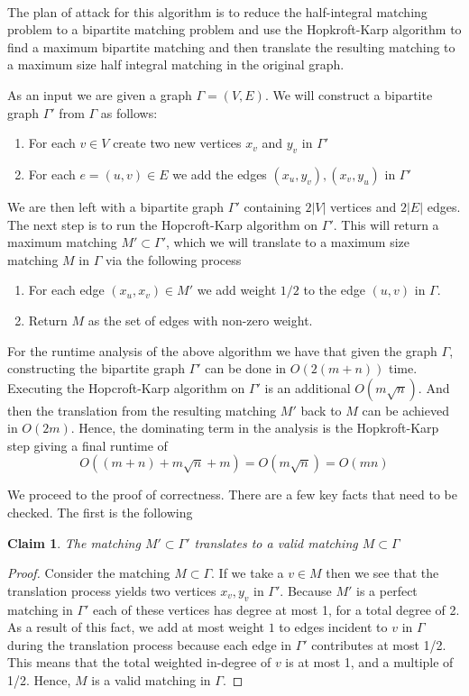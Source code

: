 \documentclass{article}
\newcommand{\problem}[1]{\noindent {\bf #1}}
\newtheorem*{claim}{Claim}
\begin{document}
\problem{Problem 3} \\
The plan of attack for this algorithm is to reduce the half-integral matching problem to a bipartite matching problem and use the Hopkroft-Karp algorithm to find a maximum bipartite matching and then translate the resulting matching to a maximum size half integral matching in the original graph.

As an input we are given a graph $\Gamma = (V,E)$. We will construct a bipartite graph $\Gamma'$ from $\Gamma$ as follows:
\begin{enumerate}
\item For each $v \in V$ create two new vertices $x_v$ and $y_v$ in $\Gamma'$
\item For each $e = (u,v) \in E$ we add the edges $(x_u,y_v), (x_v, y_u)$ in $\Gamma'$ 
\end{enumerate}

We are then left with a bipartite graph $\Gamma'$ containing $2|V|$ vertices and $2|E|$ edges. The next step is to run the Hopcroft-Karp algorithm on $\Gamma'$. This will return a maximum matching $M' \subset \Gamma'$, which we will translate to a maximum size matching $M$ in $\Gamma$ via the following process
\begin{enumerate}
\item For each edge $(x_u,x_v) \in M'$ we add weight $1/2$ to the edge $(u,v)$ in $\Gamma$. 
\item Return $M$ as the set of edges with non-zero weight. 
\end{enumerate}

For the runtime analysis of the above algorithm we have that given the graph $\Gamma$, constructing the bipartite graph $\Gamma'$ can be done in $O(2(m+n))$ time. Executing the Hopcroft-Karp algorithm on $\Gamma'$ is an additional $O(m\sqrt{n})$. And then the translation from the resulting matching $M'$ back to $M$ can be achieved in $O(2m)$. Hence, the dominating term in the analysis is the Hopkroft-Karp step giving a final runtime of 
\[
O((m+n) + m\sqrt{n} + m) = O(m\sqrt{n}) = O(mn)
\]

We proceed to the proof of correctness. There are a few key facts that need to be checked. The first is the following\\

\begin{claim}
The matching $M' \subset \Gamma'$ translates to a valid matching $M \subset \Gamma$ 
\end{claim}
\begin{proof}
Consider the matching $M \subset \Gamma$. If we take a $v \in M$ then we see that the translation process yields two vertices $x_v, y_v$ in $\Gamma'$. Because $M'$ is a perfect matching in $\Gamma'$ each of these vertices has degree at most 1, for a total degree of 2. As a result of this fact, we add at most weight $1$ to edges incident to $v$ in $\Gamma$ during the translation process because each edge in $\Gamma'$ contributes at most 1/2. This means that the total weighted in-degree of $v$ is at most 1, and a multiple of 1/2. Hence, $M$ is a valid matching in $\Gamma$.
\end{proof}
\end{document}
